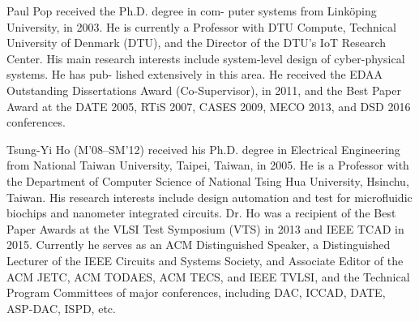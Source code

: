 \vskip -27.7pt
\begin{IEEEbiography}
{Paul Pop} 
received the Ph.D. degree in com-
puter systems from Linköping University, in 2003.
He is currently a Professor with DTU Compute,
Technical University of Denmark (DTU), and
the Director of the DTU’s IoT Research Center.
His main research interests include system-level
design of cyber-physical systems. He has pub-
lished extensively in this area. He received
the EDAA Outstanding Dissertations Award
(Co-Supervisor), in 2011, and the Best Paper
Award at the DATE 2005, RTiS 2007, CASES 2009, MECO 2013, and DSD
2016 conferences.
\end{IEEEbiography}
\vskip -27.7pt
\begin{IEEEbiography}
{Tsung-Yi Ho} (M'08--SM'12) received his Ph.D. degree in Electrical Engineering from National Taiwan
University, Taipei, Taiwan, in 2005.  He is a Professor with the Department of Computer 
Science of National Tsing Hua University, Hsinchu, Taiwan. His research interests include 
design automation and test for microfluidic biochips and nanometer integrated circuits.
Dr. Ho was a recipient of the Best Paper Awards at the VLSI Test Symposium (VTS) in 2013 and IEEE
TCAD in 2015. Currently he serves as an ACM Distinguished Speaker, 
a Distinguished Lecturer of the IEEE Circuits and
Systems Society, and Associate Editor of the ACM JETC, ACM TODAES,
ACM TECS, and IEEE TVLSI, and the Technical Program Committees of
major conferences, including DAC, ICCAD, DATE, ASP-DAC, ISPD, etc.
\end{IEEEbiography}
\vskip -27.7pt
